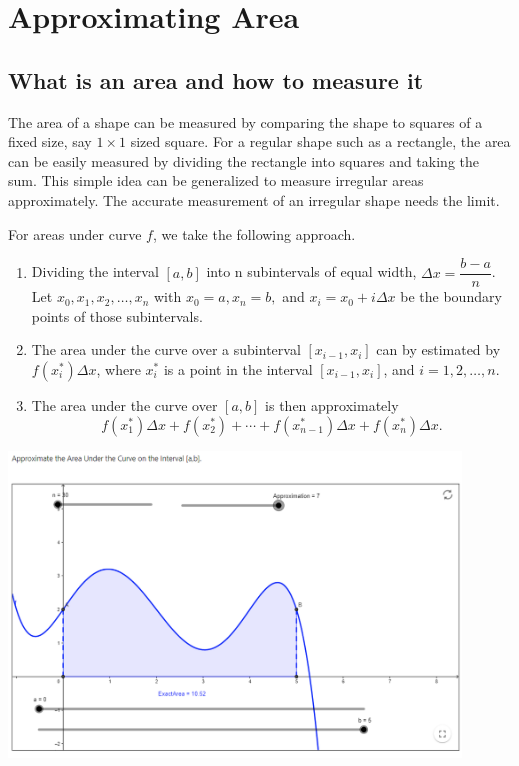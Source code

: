 
\hypertarget{approximating-area}{%
\section{Approximating Area}\label{approximating-area}}

\hypertarget{what-is-an-area-and-how-to-measure-it}{%
\subsection{What is an area and how to measure
it}\label{what-is-an-area-and-how-to-measure-it}}

The area of a shape can be measured by comparing the shape to squares of
a fixed size, say \(1\times1\) sized square. For a regular shape such as
a rectangle, the area can be easily measured by dividing the rectangle
into squares and taking the sum. This simple idea can be generalized to
measure irregular areas approximately. The accurate measurement of an
irregular shape needs the limit.

For areas under curve \(f\), we take the following approach.

\begin{enumerate}[sepno]
\item
  Dividing the interval \([a,b]\) into n subintervals of equal width,
  \(\Delta x=\dfrac{b - a}{n}\). Let \(x_0,x_1,x_2, \dots ,x_n\) with
  \(x_0=a,x_n=b,\) and \(x_i=x_0+i\Delta x\) be the boundary points of
  those subintervals.
\item
  The area under the curve over a subinterval \([x_{i-1}, x_i]\) can by
  estimated by \(f(x_i^*)\Delta x\), where \(x_i^*\) is a point in the
  interval \([x_{i-1}, x_i]\), and \(i=1,2,\dots, n\).
\item
  The area under the curve over \([a, b]\) is then approximately
  \[ f(x_1^*)\Delta x+f(x_2^*)+\cdots +f(x_{n-1}^*)\Delta x+f(x_n^*)\Delta x.\]
\end{enumerate}

\includegraphics[width=0.9\textwidth]{img/image-20200422234011771.png}


